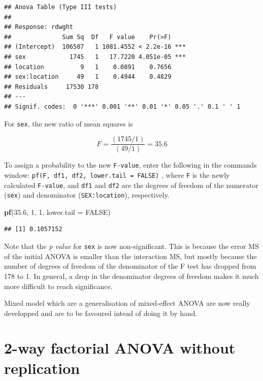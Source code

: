 \documentclass[
  12pt,
]{book}
\makeatletter
\newenvironment{Shaded}{\begin{snugshade}}{\end{snugshade}}
\newcommand{\DataTypeTok}[1]{\textcolor[rgb]{0.13,0.29,0.53}{#1}}
\newcommand{\DecValTok}[1]{\textcolor[rgb]{0.00,0.00,0.81}{#1}}
\newcommand{\FloatTok}[1]{\textcolor[rgb]{0.00,0.00,0.81}{#1}}
\newcommand{\KeywordTok}[1]{\textcolor[rgb]{0.13,0.29,0.53}{\textbf{#1}}}
\newcommand{\NormalTok}[1]{#1}
\newcommand{\OtherTok}[1]{\textcolor[rgb]{0.56,0.35,0.01}{#1}}
\newenvironment{kframe}{%
\medskip{}
\setlength{\fboxsep}{.8em}
\def\at@end@of@kframe{}%
\ifinner\ifhmode%
 \def\at@end@of@kframe{\end{minipage}}%
 \begin{minipage}{\columnwidth}%
\fi\fi%
\def\FrameCommand##1{\hskip\@totalleftmargin \hskip-\fboxsep
\colorbox{incolor}{##1}\hskip-\fboxsep
    \hskip-\linewidth \hskip-\@totalleftmargin \hskip\columnwidth}%
\MakeFramed {\advance\hsize-\width
  \@totalleftmargin\z@ \linewidth\hsize
  \@setminipage}}%
{\par\unskip\endMakeFramed%
\at@end@of@kframe}
\newenvironment{rmdblock}[1]
 {
 \begin{itemize}
 \renewcommand{\labelitemi}{
   \raisebox{-.7\height}[0pt][0pt]{
     {\setkeys{Gin}{width=3em,keepaspectratio}\texttt{[image: images/\#1]}}
   }
 }
 \begin{kframe}
 \setlength{\fboxsep}{1em}
 \item
 }
 {
 \end{kframe}
 \end{itemize}
 }
\newenvironment{rmdnote}
  {\begin{rmdblock}{note}}
  {\end{rmdblock}}
\makeatother
\begin{document}
\begin{verbatim}
## Anova Table (Type III tests)
## 
## Response: rdwght
##              Sum Sq  Df   F value    Pr(>F)    
## (Intercept)  106507   1 1081.4552 < 2.2e-16 ***
## sex            1745   1   17.7220 4.051e-05 ***
## location          9   1    0.0891    0.7656    
## sex:location     49   1    0.4944    0.4829    
## Residuals     17530 178                        
## ---
## Signif. codes:  0 '***' 0.001 '**' 0.01 '*' 0.05 '.' 0.1 ' ' 1
\end{verbatim}

For \texttt{sex}, the new ratio of mean squares is

\[F = \frac{(1745/1)}{(49/1)} = 35.6\]

To assign a probability to the new \texttt{F-value}, enter the following in the commands window: \texttt{pf(F,\ df1,\ df2,\ lower.tail\ =\ FALSE)} , where \texttt{F} is the newly calculated \texttt{F-value}, and \texttt{df1} and \texttt{df2} are the degrees of freedom of the numerator (\texttt{sex}) and denominator (\texttt{SEX:location}), respectively.

\begin{Shaded}
\begin{Highlighting}[]
\KeywordTok{pf}\NormalTok{(}\FloatTok{35.6}\NormalTok{, }\DecValTok{1}\NormalTok{, }\DecValTok{1}\NormalTok{, }\DataTypeTok{lower.tail =} \OtherTok{FALSE}\NormalTok{)}
\end{Highlighting}
\end{Shaded}

\begin{verbatim}
## [1] 0.1057152
\end{verbatim}

Note that the \emph{p value} for \texttt{sex} is now non-significant. This is because the error MS of the initial ANOVA is smaller than the interaction MS, but mostly because the number of degrees of freedom of the denominator of the F test has dropped from 178 to 1. In general, a drop in the denominator degrees of freedom makes it much more difficult to reach significance.

\begin{rmdnote}
Mixed model which are a generalisation of mixed-effect ANOVA are now really developped and are to be favoured intead of doing it by hand.
\end{rmdnote}

\hypertarget{way-factorial-anova-without-replication}{%
\section{2-way factorial ANOVA without replication}\label{way-factorial-anova-without-replication}}
\end{document}
